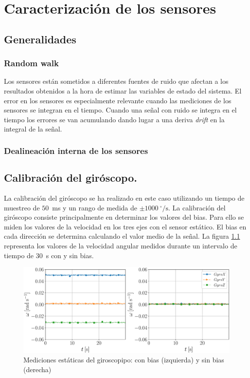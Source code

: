 \documentclass[a4paper,12pt]{book}
\begin{document}
\chapter{Caracterización de los sensores}\label{chapter:calibration}

{\color{red}
\section{Generalidades}

\subsection{Random walk}

Los sensores están sometidos a diferentes fuentes de ruido que afectan a los resultados obtenidos a la hora de estimar las variables de estado del sistema. El error en los sensores es especialmente relevante cuando las mediciones de los sensores se integran en el tiempo. Cuando una señal con ruido se integra en el tiempo los errores se van acumulando dando lugar a una deriva \emph{drift} en la integral de la señal. 

\subsection{Dealineación interna de los sensores}

}

\section{Calibración del giróscopo.}


La calibración del giróscopo se ha realizado en este caso utilizando un tiempo de muestreo de $50$~ms y un rango de medida de $\pm1000\>\mathrm{^\circ/s}$. La calibración del giróscopo consiste principalmente en determinar los valores del bias. Para ello se miden los valores de la velocidad en los tres ejes con el sensor estático. El bias en cada dirección se determina calculando el valor medio de la señal. La figura \ref{fig:gyro_bias} representa los valores de la velocidad angular medidos durante un intervalo de tiempo de $30$~s con y sin bias.

\begin{figure}[!h]
    \centering
	\includegraphics[width=0.9\linewidth]{gyro_bias.pdf}
 	\caption{Mediciones estáticas del giroscopipo: con bias (izquierda) y sin bias (derecha)}
 	\label{fig:gyro_bias}
\end{figure}
\end{document}

